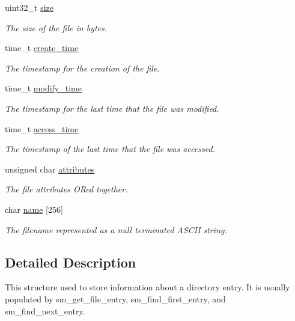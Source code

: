 \begin{DoxyCompactItemize}
\item 
uint32\-\_\-t \hyperlink{struct_s_m___d_i_r_e_c_t_o_r_y___e_n_t_r_y_ad0e3aad512c47a3d6fe159070cabc86a}{size}
\begin{DoxyCompactList}\small\item\em The size of the file in bytes. \end{DoxyCompactList}\item 
time\-\_\-t \hyperlink{struct_s_m___d_i_r_e_c_t_o_r_y___e_n_t_r_y_a2bbc971465695bc0fc7dc890a64848da}{create\-\_\-time}
\begin{DoxyCompactList}\small\item\em The timestamp for the creation of the file. \end{DoxyCompactList}\item 
time\-\_\-t \hyperlink{struct_s_m___d_i_r_e_c_t_o_r_y___e_n_t_r_y_a283ee97a6a4ef7983e95215ba9567399}{modify\-\_\-time}
\begin{DoxyCompactList}\small\item\em The timestamp for the last time that the file was modified. \end{DoxyCompactList}\item 
time\-\_\-t \hyperlink{struct_s_m___d_i_r_e_c_t_o_r_y___e_n_t_r_y_a1806d1e38d20746f32000cb56a7d4a66}{access\-\_\-time}
\begin{DoxyCompactList}\small\item\em The timestamp of the last time that the file was accessed. \end{DoxyCompactList}\item 
unsigned char \hyperlink{struct_s_m___d_i_r_e_c_t_o_r_y___e_n_t_r_y_a1b43b135e34261ff5e40be95f2a93f39}{attributes}
\begin{DoxyCompactList}\small\item\em The file attributes O\-Red together. \end{DoxyCompactList}\item 
char \hyperlink{struct_s_m___d_i_r_e_c_t_o_r_y___e_n_t_r_y_a201f16ecc991fd5d79b6d3efb65ea829}{name} \mbox{[}256\mbox{]}
\begin{DoxyCompactList}\small\item\em The filename represented as a null terminated A\-S\-C\-I\-I string. \end{DoxyCompactList}\end{DoxyCompactItemize}


\subsection{Detailed Description}
This structure used to store information about a directory entry. It is usually populated by sm\-\_\-get\-\_\-file\-\_\-entry, sm\-\_\-find\-\_\-first\-\_\-entry, and sm\-\_\-find\-\_\-next\-\_\-entry. 

